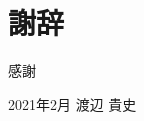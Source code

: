 \chapter*{謝辞}
\label{thankyou}
\fi

\lhead[謝辞]{}
\thispagestyle{empty}

\newpage

感謝


\begin{flushright}
2021年2月 渡辺 貴史
\end{flushright}
\fi

